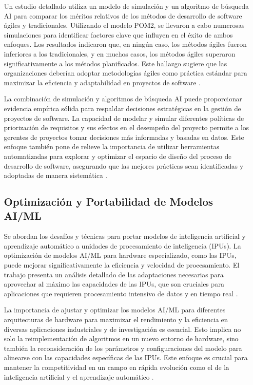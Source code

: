 Un estudio detallado utiliza un modelo de simulación y un algoritmo de búsqueda AI para comparar los méritos relativos de los métodos de desarrollo de software ágiles y tradicionales. Utilizando el modelo POM2, se llevaron a cabo numerosas simulaciones para identificar factores clave que influyen en el éxito de ambos enfoques. Los resultados indicaron que, en ningún caso, los métodos ágiles fueron inferiores a los tradicionales, y en muchos casos, los métodos ágiles superaron significativamente a los métodos planificados. Este hallazgo sugiere que las organizaciones deberían adoptar metodologías ágiles como práctica estándar para maximizar la eficiencia y adaptabilidad en proyectos de software \cite{Lemon2009}.

La combinación de simulación y algoritmos de búsqueda AI puede proporcionar evidencia empírica sólida para respaldar decisiones estratégicas en la gestión de proyectos de software. La capacidad de modelar y simular diferentes políticas de priorización de requisitos y sus efectos en el desempeño del proyecto permite a los gerentes de proyectos tomar decisiones más informadas y basadas en datos. Este enfoque también pone de relieve la importancia de utilizar herramientas automatizadas para explorar y optimizar el espacio de diseño del proceso de desarrollo de software, asegurando que las mejores prácticas sean identificadas y adoptadas de manera sistemática \cite{Lemon2009}.

\subsection{Optimización y Portabilidad de Modelos AI/ML}

Se abordan los desafíos y técnicas para portar modelos de inteligencia artificial y aprendizaje automático a unidades de procesamiento de inteligencia (IPUs). La optimización de modelos AI/ML para hardware especializado, como las IPUs, puede mejorar significativamente la eficiencia y velocidad de procesamiento. El trabajo presenta un análisis detallado de las adaptaciones necesarias para aprovechar al máximo las capacidades de las IPUs, que son cruciales para aplicaciones que requieren procesamiento intensivo de datos y en tiempo real \cite{Nasari2023}.

La importancia de ajustar y optimizar los modelos AI/ML para diferentes arquitecturas de hardware para maximizar el rendimiento y la eficiencia en diversas aplicaciones industriales y de investigación es esencial. Esto implica no solo la reimplementación de algoritmos en un nuevo entorno de hardware, sino también la reconsideración de los parámetros y configuraciones del modelo para alinearse con las capacidades específicas de las IPUs. Este enfoque es crucial para mantener la competitividad en un campo en rápida evolución como el de la inteligencia artificial y el aprendizaje automático \cite{Nasari2023}.

